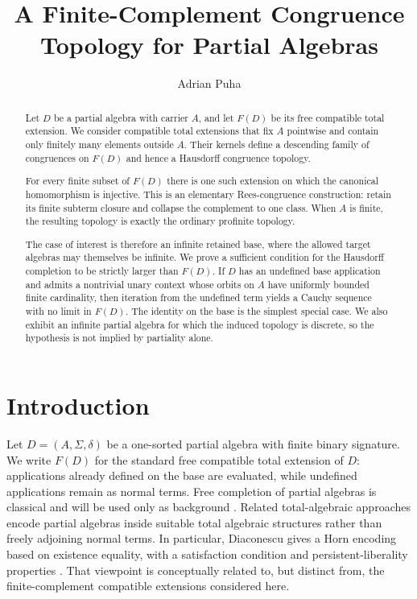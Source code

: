 \documentclass{birkau}
\theoremstyle{definition}
\theoremstyle{remark}
\begin{document}
\title[Finite-complement congruence topology]{A Finite-Complement Congruence Topology for Partial Algebras}
\author{Adrian Puha}
\address{Independent researcher}

\begin{abstract}
Let $D$ be a partial algebra with carrier $A$, and let $F(D)$ be its free
compatible total extension.  We consider compatible total extensions that fix
$A$ pointwise and contain only finitely many elements outside $A$.  Their
kernels define a descending family of congruences on $F(D)$ and hence a
Hausdorff congruence topology.

For every finite subset of $F(D)$ there is one such extension on which the
canonical homomorphism is injective.  This is an elementary Rees-congruence
construction: retain its finite subterm closure and collapse the complement to
one class.  When $A$ is finite, the resulting topology is exactly the ordinary
profinite topology.

The case of interest is therefore an infinite retained base, where the allowed
target algebras may themselves be infinite.  We prove a sufficient condition
for the Hausdorff completion to be strictly larger than $F(D)$.  If $D$ has an
undefined base application and admits a nontrivial unary context whose orbits
on $A$ have uniformly bounded finite cardinality, then iteration from the
undefined term yields a Cauchy sequence with no limit in $F(D)$.  The identity
on the base is the simplest special case.  We also exhibit an infinite partial
algebra for which the induced topology is discrete, so the hypothesis is not
implied by partiality alone.
\end{abstract}

\maketitle

\section{Introduction}\label{sec:introduction}

Let $D=(A,\Sigma,\delta)$ be a one-sorted partial algebra with finite binary
signature.  We write $F(D)$ for the standard free compatible total extension of
$D$: applications already defined on the base are evaluated, while undefined
applications remain as normal terms.  Free completion of partial algebras is
classical and will be used only as background
\cite{ClimentVidalCosmeLlopez2023,Nesin2011}.
Related total-algebraic approaches encode partial algebras inside suitable total
algebraic structures rather than freely adjoining normal terms.  In particular,
Diaconescu gives a Horn encoding based on existence equality, with a satisfaction
condition and persistent-liberality properties \cite{Diaconescu2009}.  That
viewpoint is conceptually related to, but distinct from, the finite-complement
compatible extensions considered here.
\end{document}
